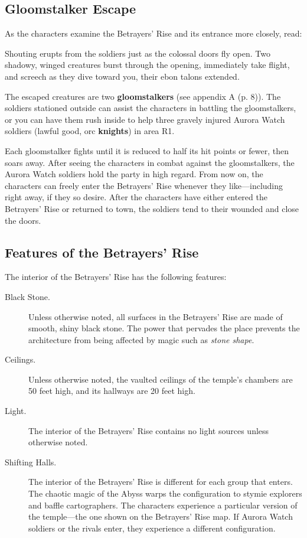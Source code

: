 \documentclass[letterpaper, 11pt, bg=full, twocolumn]{dndbook}
\begin{document}
\subsection{Gloomstalker Escape}

As the characters examine the Betrayers' Rise and its entrance more closely, read:

\begin{DndReadAloud}
Shouting erupts from the soldiers just as the colossal doors fly open. Two shadowy, winged creatures burst through the opening, immediately take flight, and screech as they dive toward you, their ebon talons extended.
\end{DndReadAloud}

The escaped creatures are two \textbf{gloomstalkers} (see appendix A (p. 8)). The soldiers stationed outside can assist the characters in battling the gloomstalkers, or you can have them rush inside to help three gravely injured Aurora Watch soldiers (lawful good, orc \textbf{knights}) in area R1.

Each gloomstalker fights until it is reduced to half its hit points or fewer, then soars away. After seeing the characters in combat against the gloomstalkers, the Aurora Watch soldiers hold the party in high regard. From now on, the characters can freely enter the Betrayers' Rise whenever they like---including right away, if they so desire. After the characters have either entered the Betrayers' Rise or returned to town, the soldiers tend to their wounded and close the doors.

\subsection{Features of the Betrayers' Rise}

The interior of the Betrayers' Rise has the following features:

\begin{description}
\item[Black Stone.] Unless otherwise noted, all surfaces in the Betrayers' Rise are made of smooth, shiny black stone. The power that pervades the place prevents the architecture from being affected by magic such as \textit{stone shape}.
\item[Ceilings.] Unless otherwise noted, the vaulted ceilings of the temple's chambers are 50 feet high, and its hallways are 20 feet high.
\item[Light.] The interior of the Betrayers' Rise contains no light sources unless otherwise noted.
\item[Shifting Halls.] The interior of the Betrayers' Rise is different for each group that enters. The chaotic magic of the Abyss warps the configuration to stymie explorers and baffle cartographers. The characters experience a particular version of the temple---the one shown on the Betrayers' Rise map. If Aurora Watch soldiers or the rivals enter, they experience a different configuration.
\end{description}
\end{document}
